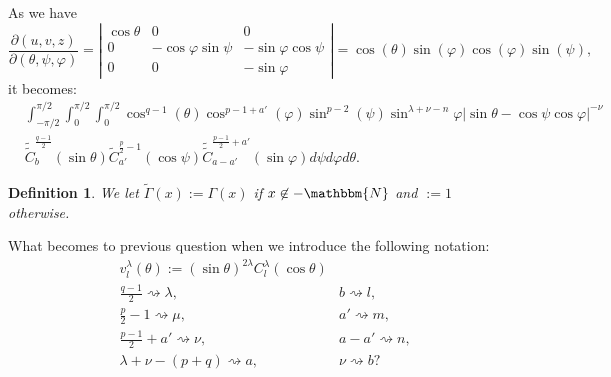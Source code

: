 \documentclass{article}
\newcommand{\assign}{:=}
\newcommand{\nin}{\not\in}
\newtheorem{definition}{Definition}
{\theorembodyfont{\rmfamily}\newtheorem{question}{Question}}
{\theorembodyfont{\rmfamily}\newtheorem{remark}{Remark}}
\begin{document}
\begin{answer}
  As we have
  \[ \frac{\partial (u, v, z)}{\partial (\theta, \psi, \varphi)} =
     \left|\begin{array}{ccc}
       \cos \theta & 0 & 0\\
       0 & - \cos \varphi \sin \psi & - \sin \varphi \cos \psi\\
       0 & 0 & - \sin \varphi
     \end{array}\right| = \cos (\theta) \sin (\varphi) \cos (\varphi) \sin
     (\psi), \]
  it becomes:
  \begin{eqnarray}
    & \int_{- \pi / 2}^{\pi / 2} \int_0^{\pi / 2} \int_0^{\pi / 2} \cos^{q -
    1} (\theta) \cos^{p - 1 + a'} (\varphi) \sin^{p - 2} (\psi) \sin^{\lambda
    + \nu - n} \varphi | \sin \theta - \cos \psi \cos \varphi |^{- \nu} & 
    \nonumber\\
    & \widetilde{\tilde{C}}^{\frac{q - 1}{2}}_b (\sin \theta)
    \tilde{C}^{\frac{p}{2} - 1}_{a'} (\cos \psi)
    \widetilde{\tilde{C}}^{\frac{p - 1}{2} + a'}_{a - a'} (\sin \varphi) d
    \psi d \varphi d \theta . &  \nonumber
  \end{eqnarray}
\end{answer}

\begin{definition}
  We let $\tilde{\Gamma} (x) \assign \Gamma (x)$ if $x \nin -\mathbbm{N}$ and
  $\assign 1$ otherwise.
\end{definition}

\begin{question}
  What becomes to previous question when we introduce the following notation:
  \begin{eqnarray}
    & v_l^{\lambda} (\theta) \assign (\sin \theta)^{2 \lambda} C^{\lambda}_l
    (\cos \theta) &  \nonumber\\
    & \frac{q - 1}{2} \rightsquigarrow \lambda, & b \rightsquigarrow l,
    \nonumber\\
    & \frac{p}{2} - 1 \rightsquigarrow \mu, & a' \rightsquigarrow m,
    \nonumber\\
    & \frac{p - 1}{2} + a' \rightsquigarrow \nu, & a - a' \rightsquigarrow n,
    \nonumber\\
    & \lambda + \nu - (p + q) \rightsquigarrow a, & \nu \rightsquigarrow b ?
    \nonumber
  \end{eqnarray}
\end{question}
\end{document}

